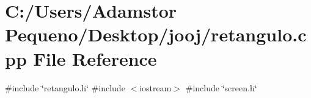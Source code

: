 \section{C\+:/\+Users/\+Adamstor Pequeno/\+Desktop/jooj/retangulo.cpp File Reference}
\label{retangulo_8cpp}
{\ttfamily \#include \char`\"{}retangulo.\+h\char`\"{}}\newline
{\ttfamily \#include $<$iostream$>$}\newline
{\ttfamily \#include \char`\"{}screen.\+h\char`\"{}}\newline
